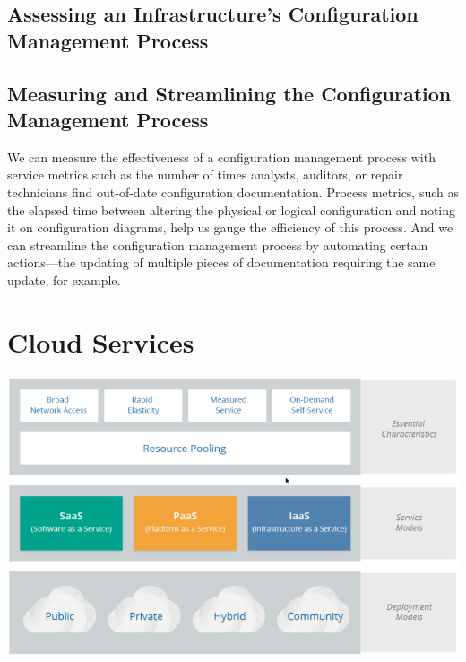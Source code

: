 \documentclass[8pt]{extarticle}
\begin{document}
\begin{multicols}{3}
\subsection{Assessing an Infrastructure’s Configuration Management Process}
\subsection{Measuring and Streamlining the Configuration Management Process}
We can measure the effectiveness of a configuration management process with service metrics such as the number of times
analysts, auditors, or repair technicians find out-of-date configuration documentation. 
Process metrics, such as the elapsed time between altering the physical or logical configuration and noting it on 
configuration diagrams, help us gauge the efficiency of this process. 
And we can streamline the configuration management process by automating certain actions—the updating of multiple 
pieces of documentation requiring the same update, for example.

\section{Cloud Services}
\includegraphics[width=\columnwidth]{cloud-services-1.png}


\end{multicols}
\end{document}
